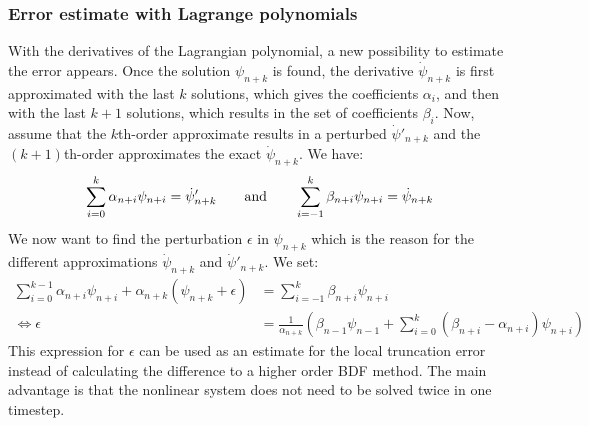 \subsubsection{Error estimate with Lagrange polynomials}
\label{sssec:errorEstimateBDFLagrange}
With the derivatives of the Lagrangian polynomial, a new possibility to estimate the error appears. Once the solution $\psi_{n+k}$ is found, the derivative $\dot{\psi}_{n+k}$ is first approximated with the last $k$ solutions, which gives the coefficients $\alpha_i$, and then with the last $k+1$ solutions, which results in the set of coefficients $\beta_i$. Now, assume that the $k$th-order approximate results in a perturbed $\dot{\psi}'_{n+k}$ and the $(k+1)$th-order approximates the exact $\dot{\psi}_{n+k}$. We have:
\begin{equation}
	\sum_{i=0}^{k}\alpha_{n+i}\psi_{n+i} = \dot{\psi}'_{n+k} \qquad \text{and}\qquad \sum_{i=-1}^{k}\beta_{n+i}\psi_{n+i} = \dot{\psi}_{n+k} \\
\end{equation}
We now want to find the perturbation $\epsilon$ in $\psi_{n+k}$ which is the reason for the different approximations $\dot{\psi}_{n+k}$ and $\dot{\psi}'_{n+k}$. We set:
\begin{align}
	\sum_{i=0}^{k-1}\alpha_{n+i}\psi_{n+i} + \alpha_{n+k}(\psi_{n+k} + \epsilon) &= \sum_{i=-1}^{k}\beta_{n+i}\psi_{n+i} \\
	\Leftrightarrow
	\epsilon &= \frac{1}{\alpha_{n+k}}\left(\beta_{n-1}\psi_{n-1} + \sum_{i=0}^{k}(\beta_{n+i}-\alpha_{n+i})\psi_{n+i}\right)
\end{align}
This expression for $\epsilon$ can be used as an estimate for the local truncation error instead of calculating the difference to a higher order BDF method. The main advantage is that the nonlinear system does not need to be solved twice in one timestep.

